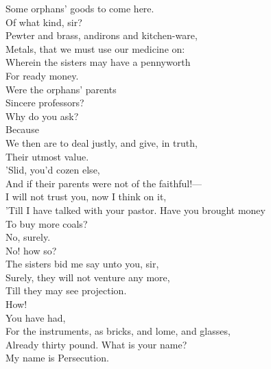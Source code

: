 \documentclass[a4paper,oneside,12pt]{memoir}
\begin{document}
\begin{drama*}
Some orphans' goods to come here.\\
\persecutionspeaks {} Of what kind, sir?\\
\subtlespeaks Pewter and brass, andirons and kitchen-ware,\\
Metals, that we must use our medicine on:\\
Wherein the sisters may have a pennyworth\\
For ready money.\\
\persecutionspeaks {} Were the orphans' parents\\
Sincere professors?\\
\subtlespeaks {} Why do you ask?\\
\persecutionspeaks {} Because\\
We then are to deal justly, and give, in truth,\\
Their utmost value.\\
\subtlespeaks {} 'Slid, you'd cozen else,\\
And if their parents were not of the faithful!---\\
I will not trust you, now I think on it,\\
'Till I have talked with your pastor. Have you brought money\\
To buy more coals?\\
\persecutionspeaks {} No, surely.\\
\subtlespeaks {} No! how so?\\
\persecutionspeaks The sisters bid me say unto you, sir,\\
Surely, they will not venture any more,\\
Till they may see projection.\\
\subtlespeaks {} How!\\
\persecutionspeaks {} You have had,\\
For the instruments, as bricks, and lome, and glasses,\\
Already thirty pound.
\subtlespeaks {} What is your name?\\
\persecutionspeaks My name is Persecution.\\

\end{drama*}
\end{document}

